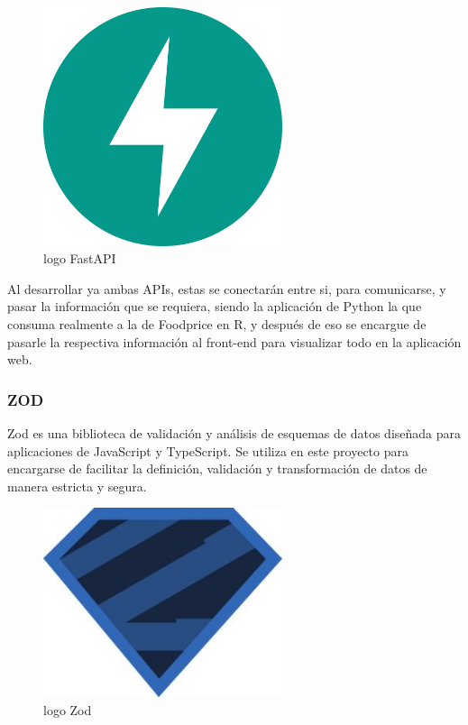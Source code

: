 \begin{figure}[H]
        \centering
        \includegraphics[width=7cm]{img/metodologia/fastapi.png}
        \caption{logo FastAPI}
        \label{fig:logoFastAPI}
    \end{figure}

Al desarrollar ya ambas APIs, estas se conectar\'an entre si, para comunicarse, y pasar la informaci\'on que se requiera, siendo la aplicaci\'on de Python la que consuma realmente a la de Foodprice en R, y despu\'es de eso se encargue de pasarle la respectiva informaci\'on al front-end para visualizar todo en la aplicaci\'on web.


\subsubsection{ZOD}
\noindent Zod es una biblioteca de validaci\'on y an\'alisis de esquemas de datos dise\~{n}ada para aplicaciones de JavaScript y TypeScript\cite{TypeScriptfirstSchemaValidation}. Se utiliza en este proyecto para encargarse de facilitar la definici\'on, validaci\'on y transformaci\'on de datos de manera estricta y segura.

\begin{figure}[H]
        \centering
        \includegraphics[width=7cm]{img/metodologia/zod logo.jpg}
        \caption{logo Zod}
        \label{fig:logoZod}
    \end{figure}

